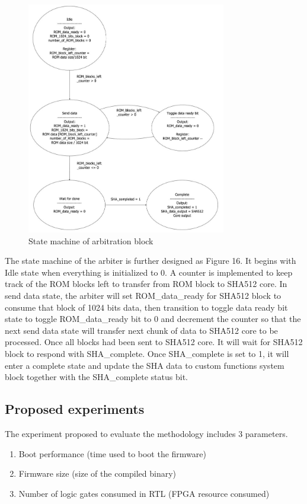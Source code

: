 \documentclass[a4paper,fleqn]{cas-dc}
\begin{document}
\begin{figure}[hbt!]
	\centering
	\includegraphics[height=4in]{figs/StateMachine.JPG}
	\caption{State machine of arbitration block}
\end{figure}


The state machine of the arbiter is further designed as Figure 16. It begins with Idle state when everything is initialized to 0. A counter is implemented to keep track of the ROM blocks left to transfer from ROM block to SHA512 core. In send data state, the arbiter will set ROM\_data\_ready for SHA512 block to consume that block of 1024 bits data, then transition to toggle data ready bit state to toggle ROM\_data\_ready bit to 0 and decrement the counter so that the next send data state will transfer next chunk of data to SHA512 core to be processed. Once all blocks had been sent to SHA512 core. It will wait for SHA512 block to respond with SHA\_complete. Once SHA\_complete is set to 1, it will enter a complete state and update the SHA data to custom functions system block together with the SHA\_complete status bit.

\subsection{ Proposed experiments}
The experiment proposed to evaluate the methodology includes 3 parameters.
\begin{enumerate}
\itemsep=-1pt 		%
\itemindent=0pt 	%
\item 
Boot performance (time used to boot the firmware)
\item 
Firmware size (size of the compiled binary)
\item 
Number of logic gates consumed in RTL (FPGA resource consumed)
\end{enumerate}
\end{document}
